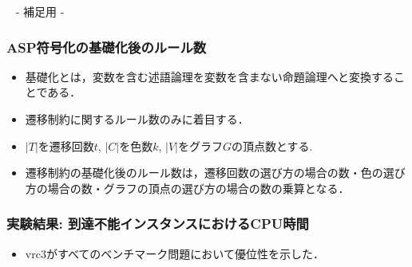 \appendix
\backupbegin

\begin{frame}{~}
 \centering
 - 補足用 -
\end{frame} 


\begin{frame}\frametitle{ASP符号化の基礎化後のルール数}
  \begin{itemize}
    \item 基礎化とは，変数を含む述語論理を変数を含まない命題論理へと変換することである．
    \item 遷移制約に関するルール数のみに着目する．
    \item $|T|$を遷移回数$t$, $|C|$を色数$k$, $|V|$をグラフ$G$の頂点数とする.
  \end{itemize}

  \begin{table}[t]
    \centering
    
  \end{table}

  \begin{itemize}
    \item 遷移制約の基礎化後のルール数は，遷移回数の選び方の場合の数・色の選び方の場合の数・グラフの頂点の選び方の場合の数の乗算となる．
  \end{itemize}
\end{frame}


\begin{frame}\frametitle{実験結果: 到達不能インスタンスにおけるCPU時間}

  \begin{table}[t]
    \centering
      
  \end{table}

  \begin{itemize}
    \item vrc3がすべてのベンチマーク問題において優位性を示した．
  \end{itemize}
  
\end{frame}


